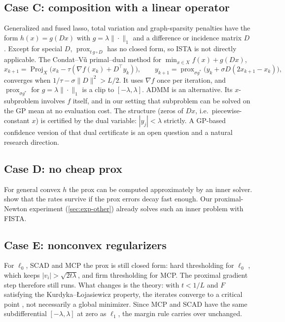 \documentclass[10pt]{article}
\newcommand{\prox}{\operatorname{prox}}
\newcommand{\proj}{\operatorname{Proj}}
\theoremstyle{remark}
\begin{document}
\subsection{Case C: composition with a linear operator}
Generalized and fused lasso, total variation and graph-sparsity penalties have the form $h(x)=g(Dx)$ with $g=\lambda\|\cdot\|_1$ and a
difference or incidence matrix $D$ \citep{tibshirani2005fused,tibshirani2011genlasso,rudin1992tv}. Except for special $D$, $\prox_{t\,g\circ D}$
has no closed form, so ISTA is not directly applicable. The Condat--V\~u primal--dual method \citep{condat2013pd,vu2013pd} for
$\min_{x\in X}f(x)+g(Dx)$,
\[
x_{k+1}=\proj_X\big(x_k-\tau(\nabla f(x_k)+D^\top y_k)\big),\qquad
y_{k+1}=\prox_{\sigma g^*}\big(y_k+\sigma D(2x_{k+1}-x_k)\big),
\]
converges when $1/\tau-\sigma\|D\|^2>L/2$. It uses $\nabla f$ once per iteration, and $\prox_{\sigma g^*}$ for $g=\lambda\|\cdot\|_1$ is a clip to
$[-\lambda,\lambda]$. ADMM \citep{boyd2011admm} is an alternative. Its $x$-subproblem involves $f$ itself, and in our setting that subproblem can be
solved on the GP mean at no evaluation cost. The structure (zeros of $Dx$, i.e.\ piecewise-constant $x$) is certified by the dual variable:
$|y_j|<\lambda$ strictly. A GP-based confidence version of that dual certificate is an open question and a natural research direction.

\subsection{Case D: no cheap prox}\label{sec:ext-noprox}
For general convex $h$ the prox can be computed approximately by an inner solver. \citet{schmidt2011inexact} show that the rates survive
if the prox errors decay fast enough. Our proximal-Newton experiment (\cref{sec:exp-other}) already solves such an inner problem with FISTA.

\subsection{Case E: nonconvex regularizers}
For $\ell_0$, SCAD and MCP \citep{fan2001scad,zhang2010mcp} the prox is still closed form: hard thresholding for $\ell_0$
\citep{blumensath2009iht}, which keeps $|v_i|>\sqrt{2t\lambda}$, and firm thresholding for MCP. The proximal gradient step therefore still runs.
What changes is the theory: with $t<1/L$ and $F$ satisfying the Kurdyka--{\L}ojasiewicz property, the iterates converge to a critical point
\citep{attouch2013kl,bolte2014palm}, not necessarily a global minimizer. Since MCP and SCAD have the same subdifferential $[-\lambda,\lambda]$
at zero as $\ell_1$, the margin rule carries over unchanged.
\end{document}
